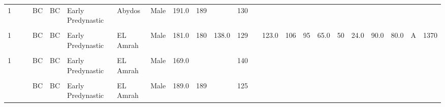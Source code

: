 \begin{table}[p]
{\begin{tabular}{rrrlllllrrrrrrrrrrrrrlr}
1 &  &  & BC & BC & Early Predynastic & Abydos & Male & 191.0 & 189 &  & 130 &  &  &  &  &  &  &  &  &  &  & \\
\addlinespace
\cellcolor{gray!10}{1} & \cellcolor{gray!10}{} & \cellcolor{gray!10}{} & \cellcolor{gray!10}{BC} & \cellcolor{gray!10}{BC} & \cellcolor{gray!10}{Early Predynastic} & \cellcolor{gray!10}{EL Amrah} & \cellcolor{gray!10}{Male} & \cellcolor{gray!10}{161.0} & \cellcolor{gray!10}{161} & \cellcolor{gray!10}{} & \cellcolor{gray!10}{129} & \cellcolor{gray!10}{} & \cellcolor{gray!10}{} & \cellcolor{gray!10}{} & \cellcolor{gray!10}{} & \cellcolor{gray!10}{} & \cellcolor{gray!10}{} & \cellcolor{gray!10}{} & \cellcolor{gray!10}{} & \cellcolor{gray!10}{} & \cellcolor{gray!10}{} & \cellcolor{gray!10}{}\\
1 &  &  & BC & BC & Early Predynastic & EL Amrah & Male & 181.0 & 180 & 138.0 & 129 &  & 123.0 & 106 & 95 & 65.0 & 50 & 24.0 & 90.0 & 80.0 & A & 1370\\
\cellcolor{gray!10}{1} & \cellcolor{gray!10}{} & \cellcolor{gray!10}{} & \cellcolor{gray!10}{BC} & \cellcolor{gray!10}{BC} & \cellcolor{gray!10}{Early Predynastic} & \cellcolor{gray!10}{EL Amrah} & \cellcolor{gray!10}{Male} & \cellcolor{gray!10}{188.0} & \cellcolor{gray!10}{188} & \cellcolor{gray!10}{138.0} & \cellcolor{gray!10}{135} & \cellcolor{gray!10}{} & \cellcolor{gray!10}{113.0} & \cellcolor{gray!10}{} & \cellcolor{gray!10}{} & \cellcolor{gray!10}{67.0} & \cellcolor{gray!10}{47} & \cellcolor{gray!10}{26.0} & \cellcolor{gray!10}{} & \cellcolor{gray!10}{} & \cellcolor{gray!10}{} & \cellcolor{gray!10}{1490}\\
1 &  &  & BC & BC & Early Predynastic & EL Amrah & Male & 169.0 &  &  & 140 &  &  &  &  &  &  &  &  &  &  & \\
\cellcolor{gray!10}{1} & \cellcolor{gray!10}{} & \cellcolor{gray!10}{} & \cellcolor{gray!10}{BC} & \cellcolor{gray!10}{BC} & \cellcolor{gray!10}{Early Predynastic} & \cellcolor{gray!10}{EL Amrah} & \cellcolor{gray!10}{Male} & \cellcolor{gray!10}{189.0} & \cellcolor{gray!10}{188} & \cellcolor{gray!10}{} & \cellcolor{gray!10}{138} & \cellcolor{gray!10}{} & \cellcolor{gray!10}{} & \cellcolor{gray!10}{} & \cellcolor{gray!10}{} & \cellcolor{gray!10}{} & \cellcolor{gray!10}{} & \cellcolor{gray!10}{} & \cellcolor{gray!10}{} & \cellcolor{gray!10}{} & \cellcolor{gray!10}{} & \cellcolor{gray!10}{}\\
\addlinespace
1 &  &  & BC & BC & Early Predynastic & EL Amrah & Male & 189.0 & 189 &  & 125 &  &  &  &  &  &  &  &  &  &  & \\

\end{tabular}}
\end{table}
